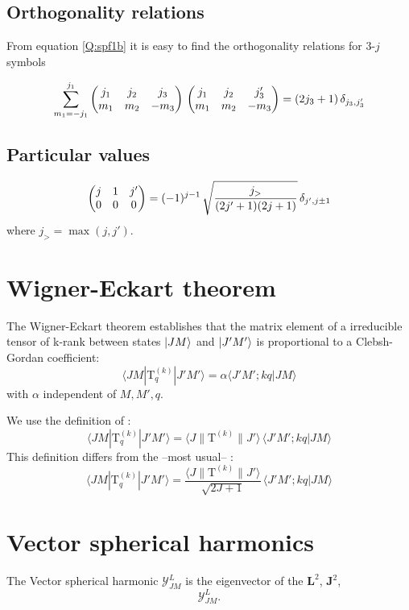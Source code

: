 \subsection{Orthogonality relations}

From equation \ref{Q:spf1b} it is easy to find the orthogonality
relations for 3-$j$ symbols

\begin{equation}\label{Q:spf1b2}
\sum_{m_{1}=-j_{1}}^{j_{1}}  \left( \begin{matrix}j_{1} & j_{2} & j_{3} \cr
m_{1} & m_{2} & -m_{3}
\end{matrix}
\right) \,  \begin{pmatrix}j_{1} & j_{2} &
j'_{3} \cr m_{1} & m_{2} & -m_{3}
\end{pmatrix}
 = ( 2 j_{3} + 1 ) \, \delta_{j_{3},j_{3}'}
\end{equation}

\subsection{Particular values}
\label{S:3j-particular-values}

\begin{equation}
  \label{Q:3j-part-val-1}
  \begin{pmatrix}  j & 1 & j' \cr 0 & 0 & 0 \end{pmatrix} 
  = (-1)^{j-1}\,  \sqrt{\frac{j_{>}}{(2j'+1)(2j+1)}} \, \delta_{j',j\pm 1}
\end{equation}
where $j_{>} = \max{(j,j')}$.
\section{Wigner-Eckart theorem}
\label{S:wign-eckart-theor}

The Wigner-Eckart theorem establishes that the matrix element of a irreducible tensor of k-rank between states $\left| JM \right\rangle$ and $\left| J'M' \right\rangle$ is proportional to a Clebsh-Gordan coefficient:
\begin{equation*}
  \langle JM|\mathrm{T}^{(k)}_q|J'M'\rangle = \alpha \langle J'M';kq|JM \rangle 
\end{equation*}
with $\alpha$ independent of $M, M', q$.

We use the definition of \autocite[appendix B]{Galindo1990_QMvI}:
\begin{equation}\label{Q:W-E-theorem-2}
  \langle JM|\mathrm{T}^{(k)}_q|J'M'\rangle = \langle J\|\mathrm{T}^{(k)} \|J' \rangle \, \langle J'M';kq|JM \rangle 
\end{equation}
This definition differs from the --most usual-- \autocite[see for instance][ch.~XIII]{Messiah1966_QMvII}:
\begin{equation}\label{Q:W-E-theorem-usual}
  \langle JM|\mathrm{T}^{(k)}_q|J'M'\rangle = \frac{\langle J\|\mathrm{T}^{(k)} \|J' \rangle}{\sqrt{2 J +1}}\, \langle J'M';kq|JM \rangle 
\end{equation}

\section{Vector spherical harmonics}

The Vector spherical harmonic $\boldsymbol{\mathcal{Y}}^{L}_{JM}$ is
the eigenvector of the $\mathbf{L}^{2}$, $\mathbf{J}^{2}$,
\[
\boldsymbol{\mathcal{Y}}^{L}_{JM}.
\]

